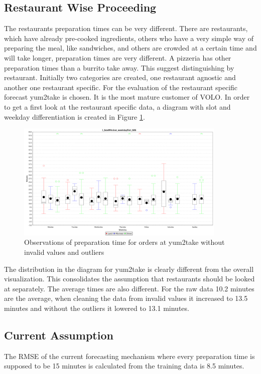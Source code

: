 \subsection{Restaurant Wise Proceeding}\label{subsection:Restaurant Wise Proceeding}
The restaurants preparation times can be very different. There are restaurants, which have already pre-cooked ingredients, others who have a very simple way of preparing the meal, like sandwiches, and others are crowded at a certain time and will take longer, preparation times are very different. A pizzeria has other preparation times than a burrito take away.\newline
This suggest distinguishing by restaurant. Initially two categories are created, one restaurant agnostic and another one restaurant specific. For the evaluation of the restaurant specific forecast yum2take is chosen. It is the most mature customer of VOLO.\newline
In order to get a first look at the restaurant specific data, a diagram with slot and weekday differentiation is created in Figure \ref{fig:1_boxWhisker_weekdaySlot_686}.
\begin{figure}[h]
\begin{center}
\includegraphics[width=10cm]{images/1_boxWhisker_weekdaySlot_686.png}
\caption{Observations of preparation time for orders at yum2take without invalid values and outliers}
\label{fig:1_boxWhisker_weekdaySlot_686}
\end{center}
\end{figure}
The distribution in the diagram for yum2take is clearly different from the overall visualization. This consolidates the assumption that restaurants should be looked at separately. The average times are also different. For the raw data 10.2 minutes are the average, when cleaning the data from invalid values it increased to 13.5 minutes and without the outliers it lowered to 13.1 minutes.
\subsection{Current Assumption}
The RMSE of the current forecasting mechanism where every preparation time is supposed to be 15 minutes is calculated from the training data is 8.5 minutes.
